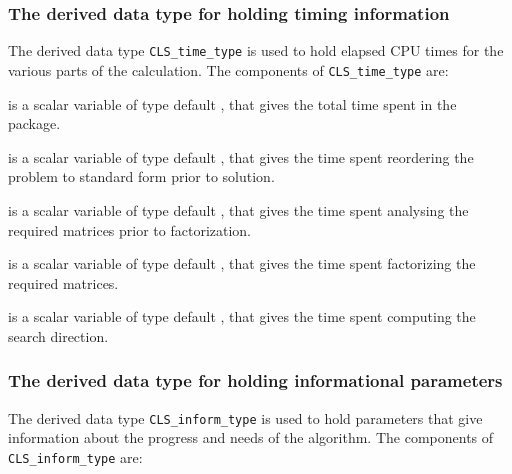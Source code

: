 \documentclass{galahad}
\newcommand{\packagename}{CLS}
\begin{document}
\subsubsection{The derived data type for holding timing 
 information}\label{typetime}
The derived data type 
{\tt \packagename\_time\_type} 
is used to hold elapsed CPU times for the various parts of the calculation.
The components of 
{\tt \packagename\_time\_type} 
are:
\begin{description}
 is a scalar variable of type default \real, that gives
 the total time spent in the package.

 is a scalar variable of type default \real, that gives
 the time spent reordering the problem to standard form prior to solution.

 is a scalar variable of type default \real, that gives
 the time spent analysing the required matrices prior to factorization.

 is a scalar variable of type default \real, that gives
 the time spent factorizing the required matrices.

 is a scalar variable of type default \real, that gives
 the time spent computing the search direction.

\end{description}


\subsubsection{The derived data type for holding informational
 parameters}\label{typeinform}
The derived data type 
{\tt \packagename\_inform\_type} 
is used to hold parameters that give information about the progress and needs 
of the algorithm. The components of 
{\tt \packagename\_inform\_type} 
are:
\end{document}
